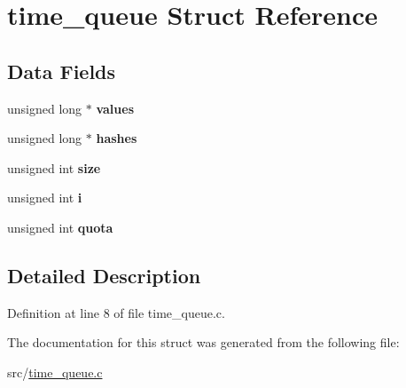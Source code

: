 \hypertarget{structtime__queue}{\section{time\-\_\-queue \-Struct \-Reference}
\label{structtime__queue}
}
\subsection*{\-Data \-Fields}
\begin{DoxyCompactItemize}
\item 
\hypertarget{structtime__queue_aede0f371f8ae284d87b2c8f26c591dd6}{unsigned long $\ast$ {\bfseries values}}\label{structtime__queue_aede0f371f8ae284d87b2c8f26c591dd6}

\item 
\hypertarget{structtime__queue_af591891fd019fc3b191755d251a8c713}{unsigned long $\ast$ {\bfseries hashes}}\label{structtime__queue_af591891fd019fc3b191755d251a8c713}

\item 
\hypertarget{structtime__queue_a783231ea41dbc7fdd60fea5438fa439f}{unsigned int {\bfseries size}}\label{structtime__queue_a783231ea41dbc7fdd60fea5438fa439f}

\item 
\hypertarget{structtime__queue_ab76a94f19133359e272e3836d1fe05df}{unsigned int {\bfseries i}}\label{structtime__queue_ab76a94f19133359e272e3836d1fe05df}

\item 
\hypertarget{structtime__queue_a8d04cb0edc950d79d70eed6d3dafc5e7}{unsigned int {\bfseries quota}}\label{structtime__queue_a8d04cb0edc950d79d70eed6d3dafc5e7}

\end{DoxyCompactItemize}


\subsection{\-Detailed \-Description}


\-Definition at line 8 of file time\-\_\-queue.\-c.



\-The documentation for this struct was generated from the following file\-:\begin{DoxyCompactItemize}
\item 
src/\hyperlink{time__queue_8c}{time\-\_\-queue.\-c}\end{DoxyCompactItemize}
